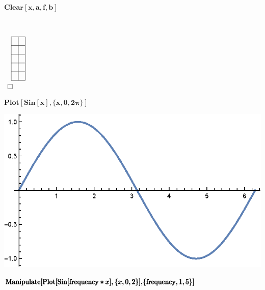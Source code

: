 \documentclass{article}
\begin{document}
\begin{doublespace}
\noindent\(\pmb{\text{Clear}[x,a,f,b]}\)
\end{doublespace}

\(\)

\begin{doublespace}
\noindent\(\begin{array}{l}
 
\begin{array}{l}
 
\begin{array}{|l|l|}
\hline
  &  \\
\hline
  &  \\
\hline
  &  \\
\hline
  &  \\
\hline
  &  \\
\hline
\end{array}
 \\
\end{array}
 \\
 \fbox{$$} \\
\end{array}\)
\end{doublespace}

\begin{doublespace}
\noindent\(\pmb{\text{Plot}[\text{Sin}[x],\{x,0,2\pi \}]}\)
\end{doublespace}

\includegraphics{WLG_gr18.eps}

\begin{doublespace}
\noindent\(\pmb{\text{Manipulate}[}\\
\pmb{\text{Plot}[\text{Sin}[\text{frequency} * x],\{x,0,2 \}],}\\
\pmb{\{\text{frequency},1,5\}]}\)
\end{doublespace}
\end{document}
